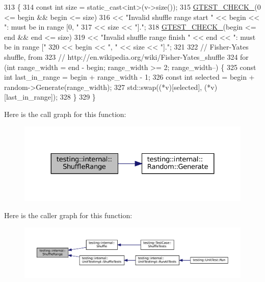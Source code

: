 \begin{DoxyCode}
313                                    \{
314   \textcolor{keyword}{const} \textcolor{keywordtype}{int} size = \textcolor{keyword}{static\_cast<}\textcolor{keywordtype}{int}\textcolor{keyword}{>}(v->size());
315   \hyperlink{gtest-port_8h_ab54343f0a36dc4cb0ce8a478dd7847b8}{GTEST\_CHECK\_}(0 <= begin && begin <= size)
316       << \textcolor{stringliteral}{"Invalid shuffle range start "} << begin << \textcolor{stringliteral}{": must be in range [0, "}
317       << size << \textcolor{stringliteral}{"]."};
318   \hyperlink{gtest-port_8h_ab54343f0a36dc4cb0ce8a478dd7847b8}{GTEST\_CHECK\_}(begin <= end && end <= size)
319       << \textcolor{stringliteral}{"Invalid shuffle range finish "} << end << \textcolor{stringliteral}{": must be in range ["}
320       << begin << \textcolor{stringliteral}{", "} << size << \textcolor{stringliteral}{"]."};
321 
322   \textcolor{comment}{// Fisher-Yates shuffle, from}
323   \textcolor{comment}{// http://en.wikipedia.org/wiki/Fisher-Yates\_shuffle}
324   \textcolor{keywordflow}{for} (\textcolor{keywordtype}{int} range\_width = end - begin; range\_width >= 2; range\_width--) \{
325     \textcolor{keyword}{const} \textcolor{keywordtype}{int} last\_in\_range = begin + range\_width - 1;
326     \textcolor{keyword}{const} \textcolor{keywordtype}{int} selected = begin + random->Generate(range\_width);
327     std::swap((*v)[selected], (*v)[last\_in\_range]);
328   \}
329 \}
\end{DoxyCode}
Here is the call graph for this function\+:
\nopagebreak
\begin{figure}[H]
\begin{center}
\leavevmode
\includegraphics[width=324pt]{namespacetesting_1_1internal_a0e1d3dc36138a591769412d4c7779861_cgraph}
\end{center}
\end{figure}
Here is the caller graph for this function\+:
\nopagebreak
\begin{figure}[H]
\begin{center}
\leavevmode
\includegraphics[width=350pt]{namespacetesting_1_1internal_a0e1d3dc36138a591769412d4c7779861_icgraph}
\end{center}
\end{figure}
\mbox{\label{namespacetesting_1_1internal_a244d9a3765727306b597b8992ab84036}} 
